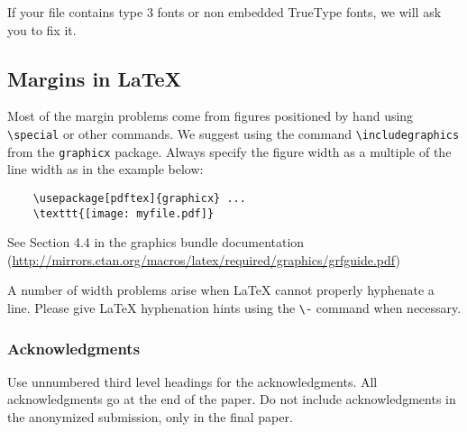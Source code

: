 \documentclass{article}
\begin{document}
	If your file contains type 3 fonts or non embedded TrueType fonts, we will ask
	you to fix it.
	
	\subsection{Margins in \LaTeX{}}
	
	Most of the margin problems come from figures positioned by hand using
	\verb+\special+ or other commands. We suggest using the command
	\verb+\includegraphics+ from the \verb+graphicx+ package. Always specify the
	figure width as a multiple of the line width as in the example below:
	\begin{verbatim}
	\usepackage[pdftex]{graphicx} ...
	\texttt{[image: myfile.pdf]}
	\end{verbatim}
	See Section 4.4 in the graphics bundle documentation
	(\url{http://mirrors.ctan.org/macros/latex/required/graphics/grfguide.pdf})
	
	A number of width problems arise when \LaTeX{} cannot properly hyphenate a
	line. Please give LaTeX hyphenation hints using the \verb+\-+ command when
	necessary.
	
	\subsubsection*{Acknowledgments}
	
	Use unnumbered third level headings for the acknowledgments. All acknowledgments
	go at the end of the paper. Do not include acknowledgments in the anonymized
	submission, only in the final paper.
	
	
	
	
\end{document}
